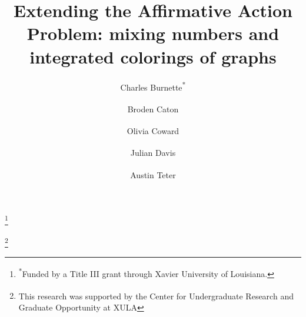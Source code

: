 \documentclass[11pt, reqno]{amsart}
\theoremstyle{definition}
\begin{document}
\title[Extending the Affirmative Action Problem]{Extending the Affirmative Action Problem: mixing numbers and integrated colorings of graphs}
                 
              
\author[Burnette]{Charles Burnette\textsuperscript{*}}
            \thanks{\textsuperscript{*}Funded by a Title III grant through Xavier University of Louisiana.}
           \address{Department of Mathematics, Xavier University of Louisiana,New Orleans, Louisiana 70125-1098, USA}
\author[Caton]{Broden Caton\textsuperscript{\textdagger}}
            \thanks{\textsuperscript{\textdagger}This research was supported by the Center for Undergraduate Research and Graduate Opportunity at XULA}
          \address{Department of Physics and Computer Science, Xavier University of Louisiana, New Orleans, Louisiana 70125-1098, USA}
\author[Coward]{Olivia Coward\textsuperscript{\textdagger}}
            \address{Department of Mathematics, Xavier University of Louisiana, New Orleans, Louisiana 70125-1098, USA}
\author[Davis]{Julian Davis\textsuperscript{\textdagger}}
            \address{Department of Mathematics, Xavier University of Louisiana, New Orleans, Louisiana 70125-1098, USA}
\author[Teter]{Austin Teter\textsuperscript{\textdagger}}
            \address{Department of Mathematics, Xavier University of Louisiana, New Orleans, Louisiana 70125-1098, USA}


            
\end{document}
